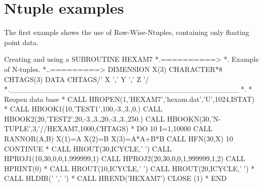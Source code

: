 \section{Ntuple examples}

The first example shows the use of Row-Wise-Ntuples, containing
only floating point data.

\begin{XMPt}{Creating and using a \RWN{}}
      SUBROUTINE HEXAM7
*.==========>
*.           Example of N-tuples.
*..=========>
      DIMENSION X(3)
      CHARACTER*8 CHTAGS(3)
      DATA CHTAGS/'   X   ','   Y   ','   Z   '/
*.___________________________________________
*.
*             Reopen data base
*
      CALL HROPEN(1,'HEXAM7','hexam.dat','U',1024,ISTAT)
*
      CALL HBOOK1(10,'TEST1',100,-3.,3.,0.)
      CALL HBOOK2(20,'TEST2',20,-3.,3.,20,-3.,3.,250.)
      CALL HBOOKN(30,'N-TUPLE',3,'//HEXAM7,1000,CHTAGS)
*
      DO 10 I=1,10000
         CALL RANNOR(A,B)
         X(1)=A
         X(2)=B
         X(3)=A*A+B*B
         CALL HFN(30,X)
  10  CONTINUE
*
      CALL HROUT(30,ICYCLE,' ')
      CALL HPROJ1(10,30,0,0,1,999999,1)
      CALL HPROJ2(20,30,0,0,1,999999,1,2)
      CALL HPRINT(0)
*
      CALL HROUT(10,ICYCLE,' ')
      CALL HROUT(20,ICYCLE,' ')
*
      CALL HLDIR(' ',' ')
*
      CALL HREND('HEXAM7')
      CLOSE (1)
*
      END
\end{XMPt}
\newpage
